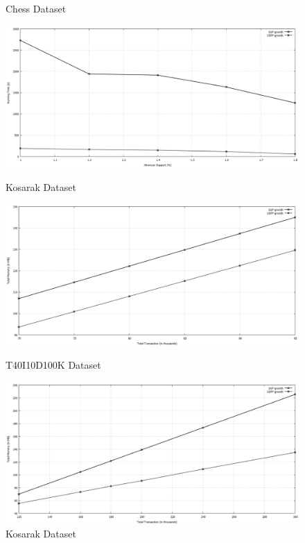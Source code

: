 \documentclass[conference]{IEEEtran}
\begin{document}
\begin{figure}[t]
\begin{minipage}{0.32\linewidth}
		\caption{Chess Dataset }
		\label{result:g_chess_total}
	\end{minipage}%
\end{figure}
\begin{figure}[t]
	\begin{minipage}{0.32\linewidth}
	   \centering
	   \includegraphics[width=\textwidth]{images/result/g_k_total}
	   \caption{Kosarak Dataset }
	   \label{result:g_k_total}
		\end{minipage}
	\begin{minipage}{0.32\linewidth}
		\centering
		\includegraphics[width=\textwidth]{images/result/g_t10_memory_node}
		\caption{T40I10D100K Dataset }
		\label{result:g_t10_memory_node}
	\end{minipage}%
	\begin{minipage}{0.32\linewidth}
	   \centering
	   \includegraphics[width=\textwidth]{images/result/g_k_memory_node}
	   \caption{Kosarak Dataset }
	   \label{result:g_k_memory_node}
    \end{minipage}
\end{figure}
\end{document}
